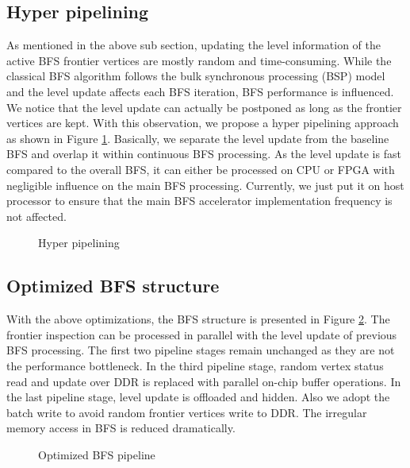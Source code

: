 \subsection{Hyper pipelining}
As mentioned in the above sub section, updating the level information of the active 
BFS frontier vertices are mostly random and time-consuming. While the classical BFS 
algorithm follows the bulk synchronous processing (BSP) model and the level update
affects each BFS iteration, BFS performance is influenced. We notice that the level update 
can actually be postponed as long as the frontier vertices are kept. With this observation, 
we propose a hyper pipelining approach as shown in Figure \ref{fig:hyper}. Basically, 
we separate the level update from the baseline BFS and overlap it within continuous BFS processing.  
As the level update is fast compared to the overall BFS, it can either be processed on CPU or FPGA 
with negligible influence on the main BFS processing. Currently, we just put it on host processor 
to ensure that the main BFS accelerator implementation frequency is not affected.
\begin{figure}
	\caption{Hyper pipelining}
\label{fig:hyper}
\vspace{-1em}
\end{figure}

\subsection{Optimized BFS structure}
With the above optimizations, the BFS structure is 
presented in Figure \ref{fig:opt-bfs}. The frontier inspection can be 
processed in parallel with the level update of previous BFS processing. 
The first two pipeline stages remain unchanged as they are not the 
performance bottleneck. In the third pipeline stage, 
random vertex status read and update over DDR is replaced with parallel 
on-chip buffer operations. In the last pipeline stage, level update is offloaded 
and hidden. Also we adopt the batch write to avoid random frontier vertices 
write to DDR. The irregular memory access in BFS is reduced dramatically.

\begin{figure}
    \caption{Optimized BFS pipeline}
\label{fig:opt-bfs}
\vspace{-1em}
\end{figure}

